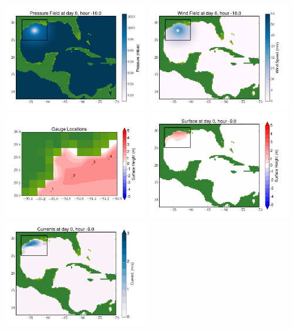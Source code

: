 \documentclass[11pt]{article}
\begin{document}
\includegraphics[width=0.475\textwidth]{frame0062fig8.png}
\vskip 10pt 
\includegraphics[width=0.475\textwidth]{frame0062fig9.png}
\includegraphics[width=0.475\textwidth]{frame0062fig10.png}
\vskip 10pt 
\includegraphics[width=0.475\textwidth]{frame0063fig1.png}
\includegraphics[width=0.475\textwidth]{frame0063fig2.png}
\end{document}
